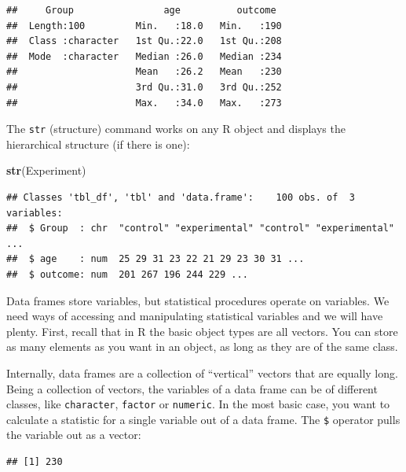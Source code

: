 \documentclass[]{svmono}
\newenvironment{Shaded}{\begin{snugshade}}{\end{snugshade}}
\newcommand{\KeywordTok}[1]{\textcolor[rgb]{0.13,0.29,0.53}{\textbf{#1}}}
\newcommand{\OperatorTok}[1]{\textcolor[rgb]{0.81,0.36,0.00}{\textbf{#1}}}
\newcommand{\NormalTok}[1]{#1}
\theoremstyle{definition}
\theoremstyle{definition}
\theoremstyle{definition}
\theoremstyle{remark}
\begin{document}
\begin{verbatim}
##     Group                age          outcome   
##  Length:100         Min.   :18.0   Min.   :190  
##  Class :character   1st Qu.:22.0   1st Qu.:208  
##  Mode  :character   Median :26.0   Median :234  
##                     Mean   :26.2   Mean   :230  
##                     3rd Qu.:31.0   3rd Qu.:252  
##                     Max.   :34.0   Max.   :273
\end{verbatim}

The \texttt{str} (structure) command works on any R object and displays
the hierarchical structure (if there is one):

\begin{Shaded}
\begin{Highlighting}[]
\KeywordTok{str}\NormalTok{(Experiment)}
\end{Highlighting}
\end{Shaded}

\begin{verbatim}
## Classes 'tbl_df', 'tbl' and 'data.frame':    100 obs. of  3 variables:
##  $ Group  : chr  "control" "experimental" "control" "experimental" ...
##  $ age    : num  25 29 31 23 22 21 29 23 30 31 ...
##  $ outcome: num  201 267 196 244 229 ...
\end{verbatim}

Data frames store variables, but statistical procedures operate on
variables. We need ways of accessing and manipulating statistical
variables and we will have plenty. First, recall that in R the basic
object types are all vectors. You can store as many elements as you want
in an object, as long as they are of the same class.

Internally, data frames are a collection of ``vertical'' vectors that
are equally long. Being a collection of vectors, the variables of a data
frame can be of different classes, like \texttt{character},
\texttt{factor} or \texttt{numeric}. In the most basic case, you want to
calculate a statistic for a single variable out of a data frame. The
\texttt{\$} operator pulls the variable out as a vector:

\begin{Shaded}
\end{Shaded}

\begin{verbatim}
## [1] 230
\end{verbatim}
\end{document}
